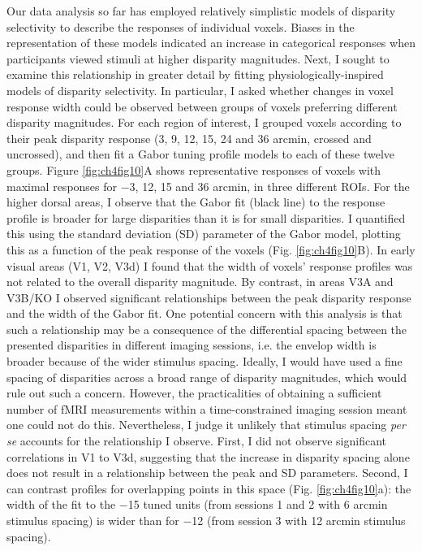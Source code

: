 Our data analysis so far has employed relatively simplistic models of disparity selectivity to describe the responses of individual voxels. Biases in the representation of these models indicated an increase in categorical responses when participants viewed stimuli at higher disparity magnitudes. Next, I sought to examine this relationship in greater detail by fitting physiologically-inspired models of disparity selectivity. In particular, I asked whether changes in voxel response width could be observed between groups of voxels preferring different disparity magnitudes. 
For each region of interest, I grouped voxels according to their peak disparity response (3, 9, 12, 15, 24 and 36 arcmin, crossed and uncrossed), and then fit a Gabor tuning profile models to each of these twelve groups. Figure \ref{fig:ch4fig10}A shows representative responses of voxels with maximal responses for $-$3, 12, 15 and 36 arcmin, in three different ROIs. For the higher dorsal areas, I observe that the Gabor fit (black line) to the response profile is broader for large disparities than it is for small disparities. I quantified this using the standard deviation (SD) parameter of the Gabor model, plotting this as a function of the peak response of the voxels (Fig. \ref{fig:ch4fig10}B). In early visual areas (V1, V2, V3d) I found that the width of voxels' response profiles was not related to the overall disparity magnitude. By contrast, in areas V3A and V3B/KO I observed significant relationships between the peak disparity response and the width of the Gabor fit.
One potential concern with this analysis is that such a relationship may be a consequence of the differential spacing between the presented disparities in different imaging sessions, i.e. the envelop width is broader because of the wider stimulus spacing. Ideally, I would have used a fine spacing of disparities across a broad range of disparity magnitudes, which would rule out such a concern. However, the practicalities of obtaining a sufficient number of fMRI measurements within a time-constrained imaging session meant one could not do this. Nevertheless, I judge it unlikely that stimulus spacing {\it per se} accounts for the relationship I observe. First, I did not observe significant correlations in V1 to V3d, suggesting that the increase in disparity spacing alone does not result in a relationship between the peak and SD parameters. Second, I can contrast profiles for overlapping points in this space (Fig. \ref{fig:ch4fig10}a): the width of the fit to the $-$15 tuned units (from sessions 1 and 2 with 6 arcmin stimulus spacing) is wider than for $-$12 (from session 3 with 12 arcmin stimulus spacing). 

